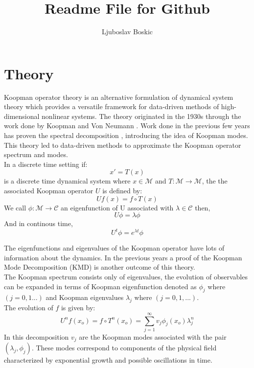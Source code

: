 \documentclass{article}
\title{Readme File for Github}
\author{Ljuboslav Boskic}
\begin{document}
\maketitle
\section*{Theory}
Koopman operator theory is an alternative formulation of dynamical system theory which provides a versatile framework for data-driven methods of high-dimensional nonlinear systems. The theory originated in the 1930s through the work done by Koopman and Von Neumann \autocite[1]{koopman1932dynamical}. Work done in the previous few years has proven the spectral decomposition\autocite[2]{IM04} \autocite[3]{IM05} , introducing the idea of Koopman modes. This theory led to data-driven methods to approximate the Koopman operator spectrum and modes.\\

In a discrete time setting if:
\begin{equation}
x' = T(x)
\end{equation}
is a discrete time dynamical system where $x\in \mathcal{M}$ and $T: \mathcal{M} \to \mathcal{M}$, the the associated Koopman operator $U$ is defined by:
\begin{equation}
Uf(x)=f\circ T(x)
\end{equation}
We call $\phi: \mathcal{M}\to \mathcal{C}$ an eigenfunction of U associated with $\lambda \in \mathcal{C}$ then,
\begin{equation}
U\phi =\lambda \phi
\end{equation}
And in continous time,
\begin{equation}
U^t\phi = e^{\lambda t}\phi
\end{equation}

The eigenfunctions and eigenvalues of the Koopman operator have lots of information about the dynamics. In the previous years a proof of the Koopman Mode Decomposition (KMD) is another outcome of this theory.\\

The Koopman spectrum consists only of eigenvalues, the evolution of observables can be expanded in terms of Koopman eigenfunction denoted as $\phi_j$ where $(j=0,1...)$ and Koopman eigenvalues $\lambda_j$ where $(j=0,1,...)$.\\
The evolution of $f$ is given by:
\begin{equation}
U^nf(x_o) = f \circ T^n(x_o) = \sum_{j=1}^{\infty} v_j\phi_j(x_o)\lambda_{j}^{n} 
\end{equation}
In this decomposition $v_j$ are the Koopman modes associated with the pair $(\lambda_j,\phi_j)$. These modes correspond to components of the physical field characterized by exponential growth and possible oscillations in time.\\
\end{document}

